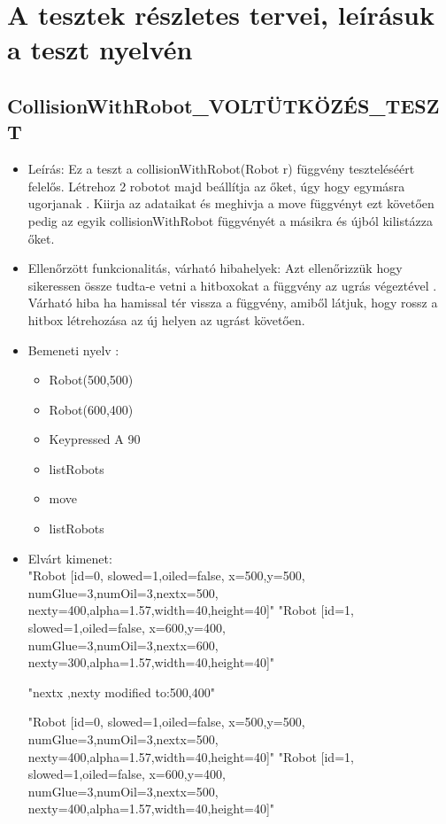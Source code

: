\section{A tesztek részletes tervei, leírásuk a teszt nyelvén}

\subsection{CollisionWithRobot\_VOLTÜTKÖZÉS\_TESZT}
\begin{itemize}
	\item Leírás: Ez a teszt a collisionWithRobot(Robot r) függvény teszteléséért felelős.
			Létrehoz 2 robotot majd beállítja az őket, úgy hogy egymásra ugorjanak .
			Kiirja az adataikat  és meghivja a move függvényt ezt követően pedig az egyik collisionWithRobot függvényét a másikra	és újból kilistázza őket.	\newline
	\item Ellenőrzött funkcionalitás, várható hibahelyek: Azt ellenőrizzük hogy sikeressen össze tudta-e vetni a hitboxokat a függvény az ugrás végeztével .
	Várható hiba ha hamissal tér vissza a függvény, amiből látjuk, hogy rossz a hitbox létrehozása az új helyen az ugrást követően.
	\item Bemeneti nyelv :
		\begin{itemize}
		\item Robot(500,500)
		\item Robot(600,400)
		\item Keypressed A 90 
		\item listRobots
		\item move
		\item listRobots
		\end{itemize}

	\item Elvárt kimenet: \\
		"Robot [id=0,  slowed=1,oiled=false, x=500,y=500, 
		\\numGlue=3,numOil=3,nextx=500,
		\\nexty=400,alpha=1.57,width=40,height=40]"\newline
		"Robot [id=1,  slowed=1,oiled=false, x=600,y=400, 
		\\numGlue=3,numOil=3,nextx=600,
		\\nexty=300,alpha=1.57,width=40,height=40]"
		
		"nextx ,nexty modified to:500,400"
	
		"Robot [id=0,  slowed=1,oiled=false, x=500,y=500, 
		\\numGlue=3,numOil=3,nextx=500,
		\\nexty=400,alpha=1.57,width=40,height=40]"\newline
		"Robot [id=1,  slowed=1,oiled=false, x=600,y=400, 
		\\numGlue=3,numOil=3,nextx=500,
		\\nexty=400,alpha=1.57,width=40,height=40]"


\end{itemize}
